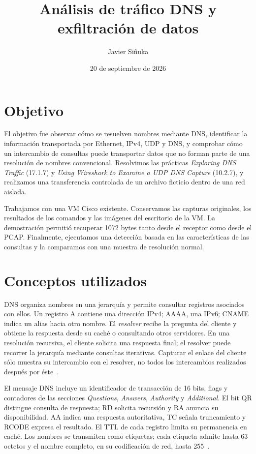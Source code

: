 \documentclass[11pt,a4paper]{article}
\title{Análisis de tráfico DNS y exfiltración de datos}
\author{Javier Siñuka}
\date{20 de septiembre de 2026}
\begin{document}
\renewcommand{\tablename}{Tabla}
\maketitle

\section{Objetivo}

El objetivo fue observar cómo se resuelven nombres mediante DNS, identificar
la información transportada por Ethernet, IPv4, UDP y DNS, y comprobar cómo
un intercambio de consultas puede transportar datos que no forman parte de
una resolución de nombres convencional. Resolvimos las prácticas
\emph{Exploring DNS Traffic} (17.1.7) y \emph{Using Wireshark to Examine a UDP
DNS Capture} (10.2.7), y realizamos una transferencia controlada de un archivo
ficticio dentro de una red aislada.

Trabajamos con una VM Cisco existente. Conservamos las capturas originales,
los resultados de los comandos y las imágenes del escritorio de la VM. La
demostración permitió recuperar 1072 bytes tanto desde el receptor como desde
el PCAP. Finalmente, ejecutamos una detección basada en las características
de las consultas y la comparamos con una muestra de resolución normal.

\section{Conceptos utilizados}

DNS organiza nombres en una jerarquía y permite consultar registros asociados
con ellos. Un registro A contiene una dirección IPv4; AAAA, una IPv6; CNAME
indica un alias hacia otro nombre. El \emph{resolver} recibe la pregunta del
cliente y obtiene la respuesta desde su caché o consultando otros servidores.
En una resolución recursiva, el cliente solicita una respuesta final; el
resolver puede recorrer la jerarquía mediante consultas iterativas. Capturar
el enlace del cliente sólo muestra su intercambio con el resolver, no todos
los intercambios realizados después por éste~\cite{rfc1034}.

El mensaje DNS incluye un identificador de transacción de 16 bits, flags y
contadores de las secciones \emph{Questions}, \emph{Answers}, \emph{Authority}
y \emph{Additional}. El bit QR distingue consulta de respuesta; RD solicita
recursión y RA anuncia su disponibilidad. AA indica una respuesta autoritativa,
TC señala truncamiento y RCODE expresa el resultado. El TTL de cada registro
limita su permanencia en caché. Los nombres se transmiten como etiquetas;
cada etiqueta admite hasta 63 octetos y el nombre completo, en su codificación
de red, hasta 255~\cite{rfc1035}.
\end{document}
